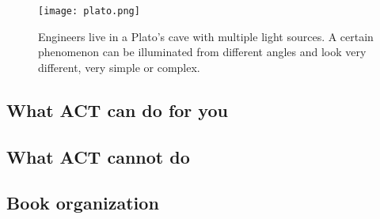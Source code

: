 \begin{figure}[h]
    \centering
\texttt{[image: plato.png]}
\caption{\label{fig:aspects}
    Engineers live in a Plato's cave with multiple light sources.
    A certain phenomenon can be illuminated from different angles
    and look very different, very simple or complex.
}
\end{figure} 


\subsection{What ACT can do for you}




\subsection{What ACT cannot do}


\subsection{Book organization}

